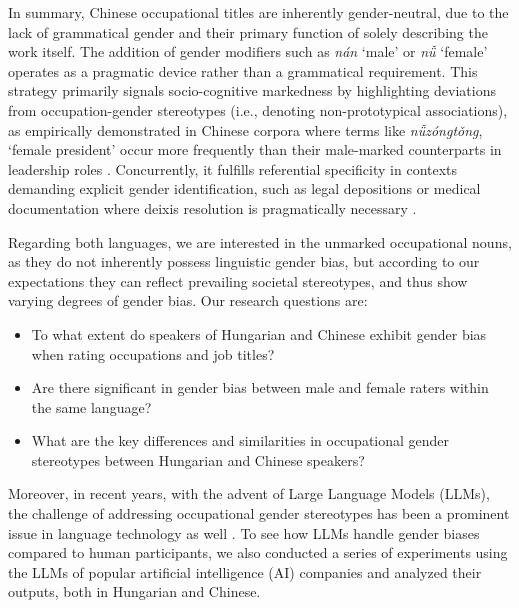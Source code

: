 \documentclass[11pt]{article}
\newcommand{\zh}[1]{\simplifiedchinesefont{#1}\rmfamily}
\begin{document}
In summary, Chinese occupational titles are inherently gender-neutral, due to the lack of grammatical gender and their primary function of solely describing the work itself. The addition of gender modifiers such as \zh{男} \textit{nán} `male' or \zh{女} \textit{nǚ} `female' operates as a pragmatic device rather than a grammatical requirement. This strategy primarily signals socio-cognitive markedness by highlighting deviations from occupation-gender stereotypes (i.e., denoting non-prototypical associations), as empirically demonstrated in Chinese corpora where terms like \zh{女总统} \textit{nǚzóngtǒng}, `female president' occur more frequently than their male-marked counterparts in leadership roles \citep{su_2021_occupational,farris_1988_gender}. Concurrently, it fulfills referential specificity in contexts demanding explicit gender identification, such as legal depositions or medical documentation where deixis resolution is pragmatically necessary \citep{hellinger_2003_gender,stahlberg_2011_representation}.


Regarding both languages, we are interested in the unmarked occupational nouns, as they do not inherently possess linguistic gender bias, but according to our expectations they can reflect prevailing societal stereotypes, and thus show varying degrees of gender bias. Our research questions are: 
\begin{itemize}
  \item To what extent do speakers of Hungarian and Chinese exhibit gender bias when rating occupations and job titles?
  \item Are there significant in gender bias between male and female raters within the same language?
  \item What are the key differences and similarities in occupational gender stereotypes between Hungarian and Chinese speakers?
\end{itemize}

Moreover, in recent years, with the advent of Large Language Models (LLMs), the challenge of addressing occupational gender stereotypes has been a prominent issue in language technology as well \citep[cf.][]{kirk_2021_bias,ju_2024_female,an_2025_mutual}. To see how LLMs handle gender biases compared to human participants, we also conducted a series of experiments using the LLMs of popular artificial intelligence (AI) companies and analyzed their outputs, both in Hungarian and Chinese.

\end{document}
